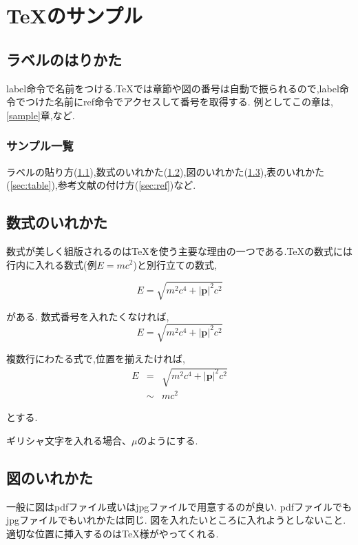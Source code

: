 \chapter{\TeX のサンプル} \label{sec:sample}

\section{ラベルのはりかた}\label{sec:label}
label命令で名前をつける.\TeX では章節や図の番号は自動で振られるので,label命令でつけた名前にref命令でアクセスして番号を取得する.
例としてこの章は,\ref{sample}章,など.

\subsection{サンプル一覧}\label{sec:list}
ラベルの貼り方(\ref{sec:label}),数式のいれかた(\ref{sec:eq}),図のいれかた(\ref{sec:figure}),表のいれかた(\ref{sec:table}),参考文献の付け方(\ref{sec:ref})など.

\section{数式のいれかた}\label{sec:eq}
数式が美しく組版されるのは\TeX を使う主要な理由の一つである.\TeX の数式には行内に入れる数式(例$E=mc^2$)と別行立ての数式,

\begin{equation}
	E = \sqrt{m^2 c^4 +|\bm{p}|^2 c^2}
\end{equation}

がある.
数式番号を入れたくなければ,
\begin{equation}
	\nonumber
	E = \sqrt{m^2 c^4 +|\bm{p}|^2 c^2}
\end{equation}

複数行にわたる式で,位置を揃えたければ,
\begin{eqnarray}
	\nonumber
	E & =    & \sqrt{m^2 c^4 +|\bm{p}|^2 c^2} \\
	  & \sim & mc^2
\end{eqnarray}

とする.

ギリシャ文字を入れる場合、$\mu$のようにする.

\section{図のいれかた}\label{sec:figure}

一般に図はpdfファイル或いはjpgファイルで用意するのが良い.
pdfファイルでもjpgファイルでもいれかたは同じ.
図を入れたいところに入れようとしないこと.
適切な位置に挿入するのは\TeX 様がやってくれる.


